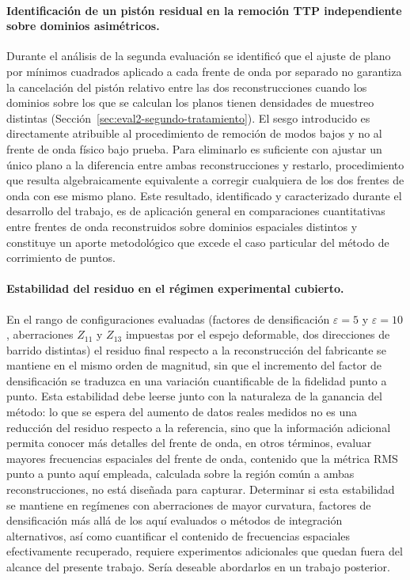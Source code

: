 \documentclass[letterpaper,12pt,oneside]{book}
\begin{document}
\paragraph{Identificación de un pistón residual en la remoción TTP independiente sobre
dominios asimétricos.} Durante el análisis de la segunda evaluación se identificó que el
ajuste de plano por mínimos cuadrados aplicado a cada frente de onda por separado no
garantiza la cancelación del pistón relativo entre las dos reconstrucciones cuando los
dominios sobre los que se calculan los planos tienen densidades de muestreo distintas
(Sección~\ref{sec:eval2-segundo-tratamiento}). El sesgo introducido es directamente
atribuible al procedimiento de remoción de modos bajos y no al frente de onda físico bajo
prueba. Para eliminarlo es suficiente con ajustar un único plano a la diferencia entre
ambas reconstrucciones y restarlo, procedimiento que resulta algebraicamente equivalente a
corregir cualquiera de los dos frentes de onda con ese mismo plano. Este resultado,
identificado y caracterizado durante el desarrollo del trabajo, es de aplicación general
en comparaciones cuantitativas entre frentes de onda reconstruidos sobre dominios
espaciales distintos y constituye un aporte metodológico que excede el caso particular del
método de corrimiento de puntos.

\paragraph{Estabilidad del residuo en el régimen experimental cubierto.} En el rango de
configuraciones evaluadas (factores de densificación $\varepsilon=5$ y $\varepsilon=10$,
aberraciones $Z_{11}$ y $Z_{13}$ impuestas por el espejo deformable, dos direcciones de
barrido distintas) el residuo final respecto a la reconstrucción del fabricante se
mantiene en el mismo orden de magnitud, sin que el incremento del factor de densificación
se traduzca en una variación cuantificable de la fidelidad punto a punto. Esta estabilidad
debe leerse junto con la naturaleza de la ganancia del método: lo que se espera del
aumento de datos reales medidos no es una reducción del residuo respecto a la referencia,
sino que la información adicional permita conocer más detalles del frente de onda, en
otros términos, evaluar mayores frecuencias espaciales del frente de onda, contenido que
la métrica RMS punto a punto aquí empleada, calculada sobre la región común a ambas
reconstrucciones, no está diseñada para capturar. Determinar si esta estabilidad se
mantiene en regímenes con aberraciones de mayor curvatura, factores de densificación más
allá de los aquí evaluados o métodos de integración alternativos, así como cuantificar el
contenido de frecuencias espaciales efectivamente recuperado, requiere experimentos
adicionales que quedan fuera del alcance del presente trabajo. Sería deseable abordarlos
en un trabajo posterior.
\end{document}
